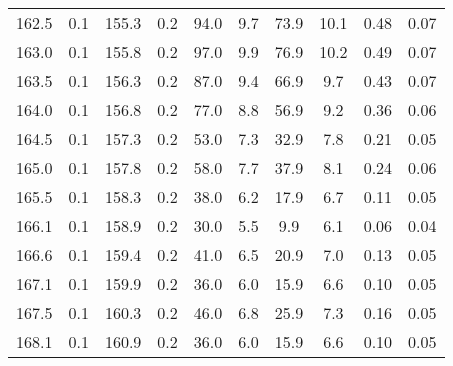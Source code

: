 \begin{tabular}{SSSSSSSSSS}
162.5 & 0.1 & 155.3 & 0.2 & 94.0  & 9.7  & 73.9  & 10.1 & 0.48 & 0.07 \\
163.0 & 0.1 & 155.8 & 0.2 & 97.0  & 9.9  & 76.9  & 10.2 & 0.49 & 0.07 \\
163.5 & 0.1 & 156.3 & 0.2 & 87.0  & 9.4  & 66.9  & 9.7  & 0.43 & 0.07 \\
164.0 & 0.1 & 156.8 & 0.2 & 77.0  & 8.8  & 56.9  & 9.2  & 0.36 & 0.06 \\
164.5 & 0.1 & 157.3 & 0.2 & 53.0  & 7.3  & 32.9  & 7.8  & 0.21 & 0.05 \\
165.0 & 0.1 & 157.8 & 0.2 & 58.0  & 7.7  & 37.9  & 8.1  & 0.24 & 0.06 \\
165.5 & 0.1 & 158.3 & 0.2 & 38.0  & 6.2  & 17.9  & 6.7  & 0.11 & 0.05 \\
166.1 & 0.1 & 158.9 & 0.2 & 30.0  & 5.5  & 9.9   & 6.1  & 0.06 & 0.04 \\
166.6 & 0.1 & 159.4 & 0.2 & 41.0  & 6.5  & 20.9  & 7.0  & 0.13 & 0.05 \\
167.1 & 0.1 & 159.9 & 0.2 & 36.0  & 6.0  & 15.9  & 6.6  & 0.10 & 0.05 \\
167.5 & 0.1 & 160.3 & 0.2 & 46.0  & 6.8  & 25.9  & 7.3  & 0.16 & 0.05 \\
168.1 & 0.1 & 160.9 & 0.2 & 36.0  & 6.0  & 15.9  & 6.6  & 0.10 & 0.05 \\
\bottomrule
\end{tabular}